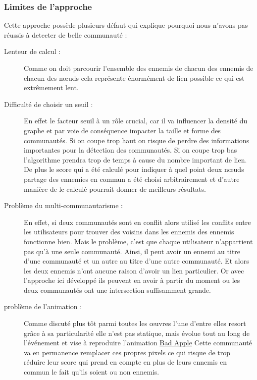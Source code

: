 \documentclass[a4paper]{article}
\begin{document}
{\subsubsection{Limites de l'approche}
Cette approche possède plusieurs défaut qui explique pourquoi nous n'avons pas réussis à detecter de belle communauté : 
\begin{description}
    \item[Lenteur de calcul :] Comme on doit parcourir l'ensemble des ennemis de chacun des ennemis de chacun des nœuds cela représente énormément de lien possible ce qui est extrêmement lent.
    \item[Difficulté de choisir un seuil :] En effet le facteur seuil à un rôle crucial, car il va influencer la densité du graphe et par voie de conséquence impacter la taille et forme des communautés. Si on coupe trop haut on risque de perdre des informations importantes pour la détection des communautés. Si on coupe trop bas l'algorithme prendra trop de temps à cause du nombre important de lien. De plus le score qui a été calculé pour indiquer à quel point deux nœuds partage des ennemies en commun a été choisi arbitrairement et d'autre manière de le calculé pourrait donner de meilleurs résultats.
    \item[Problème du multi-communautarisme :] En effet, si deux communautés sont en conflit alors utilisé les conflits entre les utilisateurs pour trouver des voisins dans les ennemis des ennemis fonctionne bien. Mais le problème, c'est que chaque utilisateur n'appartient pas qu'à une seule communauté. Ainsi, il peut avoir un ennemi au titre d'une communauté et un autre au titre d'une autre communauté. Et alors les deux ennemis n'ont aucune raison d'avoir un lien particulier. Or avec l'approche ici développé ils peuvent en avoir à partir du moment ou les deux communautés ont une intersection suffisamment grande.
    \item[problème de l'animation :] Comme discuté plus tôt parmi toutes les œuvres l'une d'entre elles resort grâce à sa particularité elle n'est pas statique, mais évolue tout au long de l'événement et vise à reproduire l'animation \href{https://www.reddit.com/r/place/comments/15bvtcu/bad_apple_rplace_2023_and_original_side_by_side/}{Bad Apple} Cette communauté va en permanence remplacer ces propres pixels ce qui risque de trop réduire leur score qui prend en compte en plus de leurs ennemis en commun le fait qu'ils soient ou non ennemis.
\end{description}


}
\end{document}
